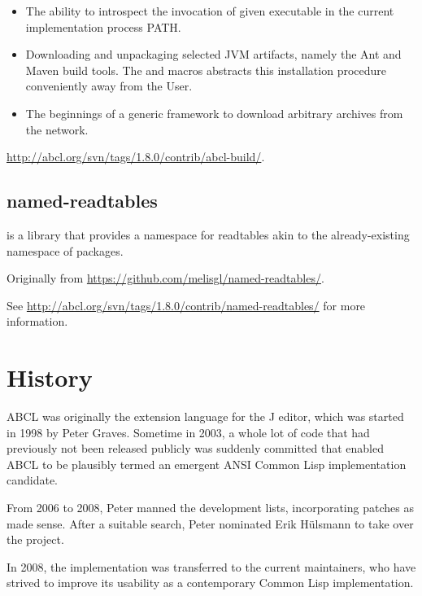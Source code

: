 \documentclass[10pt]{book}
\begin{document}
\begin{itemize}

\item The ability to introspect the invocation of given executable in
  the current implementation process PATH.

\item Downloading and unpackaging selected JVM artifacts, namely the
  Ant and Maven build tools.  The  and
   macros abstracts this installation
  procedure conveniently away from the User.

\item The beginnings of a generic framework to download arbitrary
    archives from the network.
\end{itemize}

\url{http://abcl.org/svn/tags/1.8.0/contrib/abcl-build/}.

\section{named-readtables}
\label{section:named-readtables}

 is a library that provides a namespace for
readtables akin to the already-existing namespace of packages.

Originally from \url{https://github.com/melisgl/named-readtables/}.

See \url{http://abcl.org/svn/tags/1.8.0/contrib/named-readtables/} for
more information.

\chapter{History}

\textsc{ABCL} was originally the extension language for the J editor, which was
started in 1998 by Peter Graves.  Sometime in 2003, a whole lot of
code that had previously not been released publicly was suddenly
committed that enabled ABCL to be plausibly termed an emergent ANSI
Common Lisp implementation candidate.

From 2006 to 2008, Peter manned the development lists, incorporating
patches as made sense.  After a suitable search, Peter nominated Erik
H\"{u}lsmann to take over the project.

In 2008, the implementation was transferred to the current
maintainers, who have strived to improve its usability as a
contemporary Common Lisp implementation.
\end{document}
